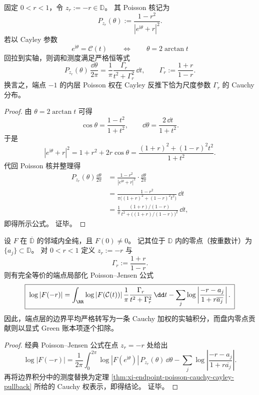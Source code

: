 \begin{theorem}\label{thm:xi-endpoint-poisson-cauchy-cayley-pullback}
固定 \(0<r<1\)，令 \(z_r:=-r\in\mathbb D\)。
其 Poisson 核记为
\[
P_{z_r}(\theta):=\frac{1-r^2}{|e^{\mathrm{i}\theta}+r|^2}.
\]
若以 Cayley 参数
\[
e^{\mathrm{i}\theta}=\mathcal C(t)
\qquad\Longleftrightarrow\qquad
\theta=2\arctan t
\]
回拉到实轴，则调和测度满足严格恒等式
\[
\boxed{\;
P_{z_r}(\theta)\,\frac{\dd\theta}{2\pi}
=
\frac{1}{\pi}\frac{\Gamma_r}{t^2+\Gamma_r^2}\,\dd t,\qquad
\Gamma_r:=\frac{1+r}{1-r}.\;}
\]
换言之，端点 \(-1\) 的内层 Poisson 权在 Cayley 反推下恰为尺度参数 \(\Gamma_r\) 的 Cauchy 分布。
\end{theorem}
\begin{proof}
由 \(\theta=2\arctan t\) 可得
\[
\cos\theta=\frac{1-t^2}{1+t^2},
\qquad
\dd\theta=\frac{2\,\dd t}{1+t^2}.
\]
于是
\[
|e^{\mathrm{i}\theta}+r|^2
=
1+r^2+2r\cos\theta
=
\frac{(1+r)^2+(1-r)^2t^2}{1+t^2}.
\]
代回 Poisson 核并整理得
\[
\begin{aligned}
P_{z_r}(\theta)\frac{\dd\theta}{2\pi}
&=
\frac{1-r^2}{|e^{\mathrm{i}\theta}+r|^2}\cdot \frac{\dd\theta}{2\pi}\\
&=
\frac{1-r^2}{\pi\bigl((1+r)^2+(1-r)^2t^2\bigr)}\,\dd t\\
&=
\frac{1}{\pi}\frac{(1+r)/(1-r)}{t^2+\bigl((1+r)/(1-r)\bigr)^2}\,\dd t,
\end{aligned}
\]
即得所示公式。
证毕。
\end{proof}

\begin{theorem}\label{thm:xi-endpoint-poisson-jensen-cauchy-ledger}
设 \(F\) 在 \(\overline{\mathbb D}\) 的邻域内全纯，且 \(F(0)\neq 0\)。
记其位于 \(\mathbb D\) 内的零点（按重数计）为 \(\{a_j\}\subset\mathbb D\)。
对 \(0<r<1\) 定义 \(z_r:=-r\) 与
\[
\Gamma_r:=\frac{1+r}{1-r}.
\]
则有完全等价的端点局部化 Poisson--Jensen 公式
\[
\boxed{\;
\log|F(-r)|
=
\int_{\RR}
\log|F(\mathcal C(t))|\,
\frac{1}{\pi}\frac{\Gamma_r}{t^2+\Gamma_r^2}\,\dd t
-\sum_j
\log\left|
\frac{-r-a_j}{1+r\overline{a_j}}
\right|.\;}
\]
因此，端点层的边界平均严格转写为一条 Cauchy 加权的实轴积分，而盘内零点贡献则以显式 Green 账本项逐个扣除。
\end{theorem}
\begin{proof}
经典 Poisson--Jensen 公式在点 \(z_r=-r\) 处给出
\[
\log|F(-r)|
=
\frac{1}{2\pi}\int_{0}^{2\pi}
\log|F(e^{\mathrm{i}\theta})|\,P_{z_r}(\theta)\,\dd\theta
-\sum_j
\log\left|
\frac{-r-a_j}{1+r\overline{a_j}}
\right|.
\]
再将边界积分中的测度替换为定理
\ref{thm:xi-endpoint-poisson-cauchy-cayley-pullback}
所给的 Cauchy 权表示，即得结论。
证毕。
\end{proof}

